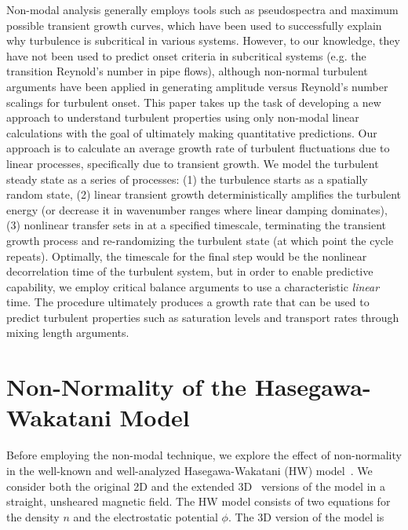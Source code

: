 \documentclass[letter,scriptaddress,twocolumn, prl,showkeys]{revtex4}
\begin{document}
Non-modal analysis generally employs tools such as pseudospectra and maximum possible transient growth curves, which have been used to successfully explain why turbulence is subcritical in various
systems. However, to our knowledge, they have not been used to predict onset criteria in subcritical systems (e.g. the transition Reynold's number in pipe flows), although non-normal
turbulent arguments have been applied in generating amplitude versus Reynold's number scalings for turbulent onset.
This paper takes up the task of developing a new approach to understand turbulent properties using only non-modal linear calculations with the goal of 
ultimately making quantitative predictions.  Our approach is to calculate an average growth rate of turbulent fluctuations due to linear processes, specifically due to transient growth.  We model the
turbulent steady state as a series of processes:  (1) the turbulence starts as a spatially random state, (2) linear transient growth deterministically amplifies the turbulent energy (or
decrease it in wavenumber ranges where linear damping dominates), (3) nonlinear transfer sets in at a specified timescale, terminating the
transient growth process and re-randomizing the turbulent state (at which point the cycle repeats).    Optimally, the timescale for the final step would be the
nonlinear decorrelation time of the turbulent system, but in order to enable predictive capability, we employ critical balance
arguments to use a characteristic \emph{linear} time. The procedure ultimately produces a growth rate that can be used
to predict turbulent properties such as saturation levels and transport rates through mixing length arguments.

\section{Non-Normality of the Hasegawa-Wakatani Model}

Before employing the non-modal technique, we explore the effect of non-normality in the well-known and well-analyzed Hasegawa-Wakatani (HW) model~\cite{hasegawa1983}. 
We consider both the original 2D and the extended 3D~\cite{biskamp1995} versions of the model in a straight, unsheared magnetic field. 
The HW model consists of two equations for the density $n$ and the electrostatic potential $\phi$. The 3D version of the model is
\end{document}
